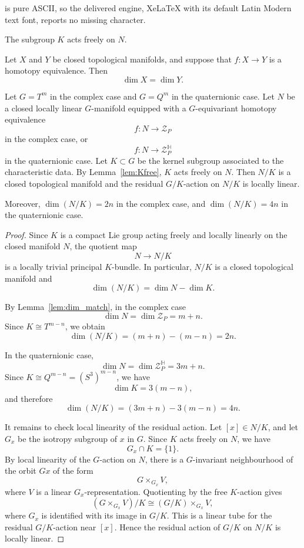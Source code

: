 \documentclass[10pt,a4paper]{amsart}
\begin{document}
is pure ASCII, so the delivered engine, XeLaTeX with its default Latin Modern text font, reports no missing character.
\begin{lemma}\label{lem:Kfree}
The subgroup $K$ acts freely on $N$.
\end{lemma}

\begin{lemma}\label{lem:dim_match}
Let \(X\) and \(Y\) be closed topological manifolds, and suppose that \(f:X\to Y\) is a homotopy equivalence. Then
\[
    \dim X=\dim Y.
\]
\end{lemma}

\begin{prop}\label{prop:quotient_manifold}
Let \(G=T^m\) in the complex case and \(G=Q^m\) in the quaternionic case.  Let \(N\) be a closed locally linear \(G\)-manifold equipped with a \(G\)-equivariant homotopy equivalence
\[
    f:N\longrightarrow \mathcal Z_P
\]
in the complex case, or
\[
    f:N\longrightarrow \mathcal Z_P^{\mathbb H}
\]
in the quaternionic case. Let \(K\subset G\) be the kernel subgroup associated to the characteristic data. By Lemma~\ref{lem:Kfree}, \(K\) acts freely on \(N\). Then \(N/K\) is a closed topological manifold and the residual \(G/K\)-action on \(N/K\) is locally linear.

Moreover, \(\dim(N/K)=2n\) in the complex case, and
\(\dim(N/K)=4n\) in the quaternionic case.
\end{prop}

\begin{proof}
Since \(K\) is a compact Lie group acting freely and locally linearly on the closed manifold \(N\), the quotient map
\[
    N\longrightarrow N/K
\]
is a locally trivial principal \(K\)-bundle. In particular, \(N/K\) is a closed topological manifold and
\[
    \dim(N/K)=\dim N-\dim K.
\]

By Lemma~\ref{lem:dim_match}, in the complex case
\[
    \dim N=\dim\mathcal Z_P=m+n.
\]
Since \(K\cong T^{m-n}\), we obtain
\[
    \dim(N/K)
    =
    (m+n)-(m-n)
    =
    2n.
\]

In the quaternionic case,
\[
    \dim N=\dim\mathcal Z_P^{\mathbb H}=3m+n.
\]
Since \(K\cong Q^{m-n}=(S^3)^{m-n}\), we have
\[
\dim K=3(m-n),
\]
and therefore
\[
\dim(N/K)=(3m+n)-3(m-n)=4n.
\]

It remains to check local linearity of the residual action. Let \([x]\in N/K\), and let \(G_x\) be the isotropy subgroup of \(x\) in \(G\). Since \(K\) acts freely on \(N\), we have
\[
G_x\cap K=\{1\}.
\]
By local linearity of the \(G\)-action on \(N\), there is a \(G\)-invariant neighbourhood of the orbit \(Gx\) of the form
\[
    G\times_{G_x} V,
\]
where \(V\) is a linear \(G_x\)-representation.  Quotienting by the free \(K\)-action gives
\[
(G\times_{G_x}V)/K\cong (G/K)\times_{G_x}V,
\]
where \(G_x\) is identified with its image in \(G/K\). This is a linear tube for the residual \(G/K\)-action near \([x]\). Hence the residual action of \(G/K\) on \(N/K\) is locally linear.
\end{proof}
\end{document}
